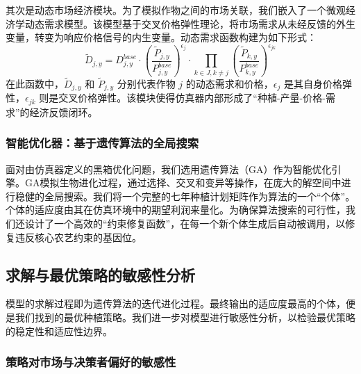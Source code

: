 \documentclass[withoutpreface,bwprint]{cumcmthesis} %
\begin{document}
其次是动态市场经济模块。为了模拟作物之间的市场关联，我们嵌入了一个微观经济学动态需求模型。该模型基于交叉价格弹性理论，将市场需求从未经反馈的外生变量，转变为响应价格信号的内生变量。动态需求函数构建为如下形式：
\begin{equation}
	\tilde{D}_{j,y} = D_{j,y}^{base} \cdot \left(\frac{\tilde{P}_{j,y}}{P_{j,y}^{base}}\right)^{\epsilon_j} \cdot \prod_{k \in J, k \neq j} \left(\frac{\tilde{P}_{k,y}}{P_{k,y}^{base}}\right)^{\epsilon_{jk}}
\end{equation}
在此函数中，$\tilde{D}_{j,y}$ 和 $\tilde{P}_{j,y}$ 分别代表作物 $j$ 的动态需求和价格，$\epsilon_j$ 是其自身价格弹性，$\epsilon_{jk}$ 则是交叉价格弹性。该模块使得仿真器内部形成了“种植-产量-价格-需求”的经济反馈闭环。

\subsubsection{智能优化器：基于遗传算法的全局搜索}

面对由仿真器定义的黑箱优化问题，我们选用遗传算法（GA）作为智能优化引擎。GA模拟生物进化过程，通过选择、交叉和变异等操作，在庞大的解空间中进行稳健的全局搜索。我们将一个完整的七年种植计划矩阵作为算法的一个“个体”。个体的适应度由其在仿真环境中的期望利润来量化。为确保算法搜索的可行性，我们还设计了一个高效的“约束修复函数”，在每一个新个体生成后自动被调用，以修复违反核心农艺约束的基因位。

\subsection{求解与最优策略的敏感性分析}

模型的求解过程即为遗传算法的迭代进化过程。最终输出的适应度最高的个体，便是我们找到的最优种植策略。我们进一步对模型进行敏感性分析，以检验最优策略的稳定性和适应性边界。

\subsubsection{策略对市场与决策者偏好的敏感性}
\end{document}
